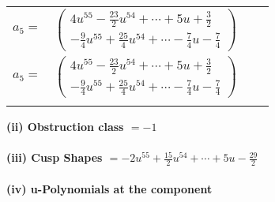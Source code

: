 \documentclass[1p]{elsarticle_modified}
\theoremstyle{definition}
\begin{document}
\begin{tabular}{m{7pt} m{180pt} m{7pt} m{180pt} }
\flushright $a_{5}=$&$\begin{pmatrix}4 u^{55}-\frac{23}{2} u^{54}+\cdots+5 u+\frac{3}{2}\\-\frac{9}{4} u^{55}+\frac{25}{4} u^{54}+\cdots-\frac{7}{4} u-\frac{7}{4}\end{pmatrix}$\\ \flushright $a_{5}=$&$\begin{pmatrix}4 u^{55}-\frac{23}{2} u^{54}+\cdots+5 u+\frac{3}{2}\\-\frac{9}{4} u^{55}+\frac{25}{4} u^{54}+\cdots-\frac{7}{4} u-\frac{7}{4}\end{pmatrix}$\\&\end{tabular}
\flushleft \textbf{(ii) Obstruction class $= -1$}\\~\\
\flushleft \textbf{(iii) Cusp Shapes $= -2 u^{55}+\frac{15}{2} u^{54}+\cdots+5 u-\frac{29}{2}$}\\~\\
\newpage\renewcommand{\arraystretch}{1}
\flushleft \textbf{(iv) u-Polynomials at the component}\newline \\
\end{document}
